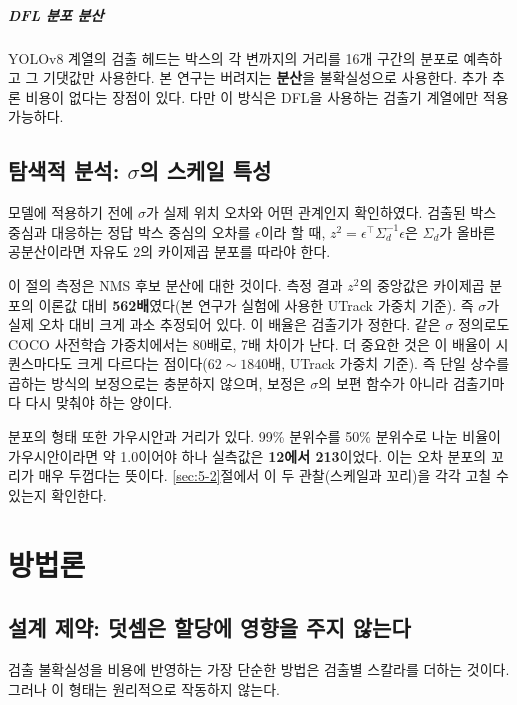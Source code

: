 \documentclass[12pt,a4paper,oneside]{report}
\begin{document}
\paragraph{DFL 분포 분산} YOLOv8 계열의 검출 헤드는 박스의 각 변까지의 거리를 16개 구간의 분포로 예측하고 그 기댓값만 사용한다. 본 연구는 버려지는 \textbf{분산}을 불확실성으로 사용한다. 추가 추론 비용이 없다는 장점이 있다. 다만 이 방식은 DFL을 사용하는 검출기 계열에만 적용 가능하다.

\section{탐색적 분석: $\sigma$의 스케일 특성}\label{sec:3-5}

모델에 적용하기 전에 $\sigma$가 실제 위치 오차와 어떤 관계인지 확인하였다. 검출된 박스 중심과 대응하는 정답 박스 중심의 오차를 $\epsilon$이라 할 때, $z^2 = \epsilon^\top \Sigma_d^{-1} \epsilon$은 $\Sigma_d$가 올바른 공분산이라면 자유도 2의 카이제곱 분포를 따라야 한다.

이 절의 측정은 NMS 후보 분산에 대한 것이다. 측정 결과 $z^2$의 중앙값은 카이제곱 분포의 이론값 대비 \textbf{562배}였다(본 연구가 실험에 사용한 UTrack 가중치 기준). 즉 $\sigma$가 실제 오차 대비 크게 과소 추정되어 있다. 이 배율은 검출기가 정한다. 같은 $\sigma$ 정의로도 COCO 사전학습 가중치에서는 $80$배로, 7배 차이가 난다. 더 중요한 것은 이 배율이 시퀀스마다도 크게 다르다는 점이다($62 \sim 1840$배, UTrack 가중치 기준). 즉 단일 상수를 곱하는 방식의 보정으로는 충분하지 않으며, 보정은 $\sigma$의 보편 함수가 아니라 검출기마다 다시 맞춰야 하는 양이다.

분포의 형태 또한 가우시안과 거리가 있다. 99\% 분위수를 50\% 분위수로 나눈 비율이 가우시안이라면 약 1.0이어야 하나 실측값은 \textbf{12에서 213}이었다. 이는 오차 분포의 꼬리가 매우 두껍다는 뜻이다. \ref{sec:5-2}절에서 이 두 관찰(스케일과 꼬리)을 각각 고칠 수 있는지 확인한다.

\chapter{방법론}

\section{설계 제약: 덧셈은 할당에 영향을 주지 않는다}\label{sec:4-1}

검출 불확실성을 비용에 반영하는 가장 단순한 방법은 검출별 스칼라를 더하는 것이다. 그러나 이 형태는 원리적으로 작동하지 않는다.
\end{document}
